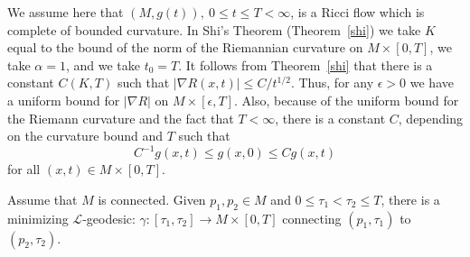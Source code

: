 We assume here that $(M,g(t)),\ 0\le t\le T<\infty$, is a Ricci flow
which is complete of bounded curvature. In Shi's Theorem
(Theorem~\ref{shi}) we take $K$ equal to the bound of the norm of
the Riemannian curvature on $M\times [0,T]$, we take $\alpha=1$, and
we take $t_0=T$. It follows from Theorem~\ref{shi} that there is a
constant $C(K,T)$ such that $|\nabla R(x,t)|\le C/t^{1/2}$. Thus,
for any $\epsilon>0$ we have a uniform bound for $|\nabla R|$ on
$M\times [\epsilon,T]$. Also, because of the uniform bound for the
Riemann curvature and the fact that $T<\infty$, there is a constant
$C$, depending on the curvature bound and $T$ such that
\begin{equation}\label{compmetric}
C^{-1}g(x,t)\le g(x,0)\le Cg(x,t)
\end{equation}
for all $(x,t)\in M\times [0,T]$.





\begin{lemma}
\label{lem:l-geodesic-existence}
\label{geoexist} Assume that $M$ is connected.
Given $p_1,p_2\in M$ and $0\le\tau_1<\tau_2\le T$, there is
 a minimizing ${\mathcal L}$-geodesic:
$\gamma\colon[\tau_{1},\tau_{2}]\to M\times [0,T]$ connecting
$(p_1,\tau_1)$ to $(p_2,\tau_2)$.
\end{lemma}

